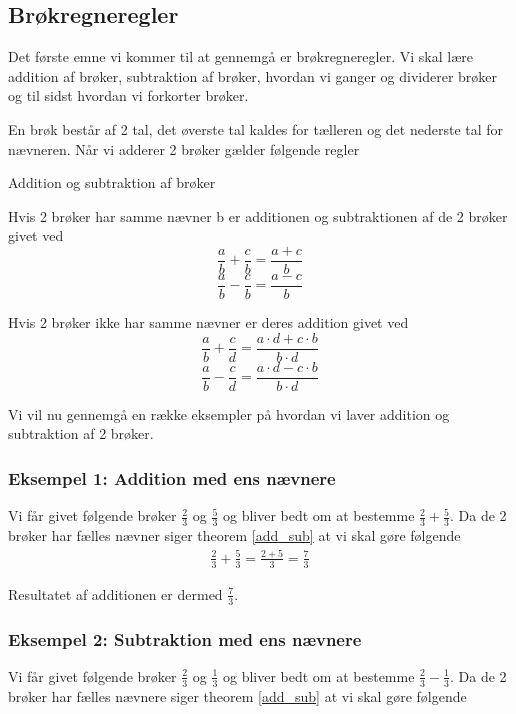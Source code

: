 \subsection{Brøkregneregler}

Det første emne vi kommer til at gennemgå er brøkregneregler. Vi skal lære addition af brøker, subtraktion af brøker, hvordan vi ganger og dividerer brøker og til sidst hvordan vi forkorter brøker. 

En brøk består af 2 tal, det øverste tal kaldes for tælleren og det nederste tal for nævneren. Når vi adderer 2 brøker gælder følgende regler

\begin{frm-thm}{Addition og subtraktion af brøker}


Hvis 2 brøker har samme nævner b er additionen og subtraktionen af de 2 brøker givet ved
\[ \frac{a}{b} + \frac{c}{b} = \frac{a + c}{b}   \]
\[\frac{a}{b} - \frac{c}{b} = \frac{a - c}{b}\]

Hvis 2 brøker ikke har samme nævner er deres addition givet ved
\[ \frac{a}{b} + \frac{c}{d} = \frac{a\cdot d + c \cdot b}{b \cdot d} \]
\[\frac{a}{b} - \frac{c}{d} = \frac{a\cdot d - c\cdot b}{b \cdot d} \]
\end{frm-thm}

Vi vil nu gennemgå en række eksempler på hvordan vi laver addition og subtraktion af 2 brøker.

\subsubsection*{Eksempel 1: Addition med ens nævnere}

Vi får givet følgende brøker $\frac{2}{3}$ og $\frac{5}{3}$ og bliver bedt om at bestemme $\frac{2}{3} + \frac{5}{3}$. Da de 2 brøker har fælles nævner siger theorem \ref{add_sub} at vi skal gøre følgende
\begin{align*}
\frac{2}{3} + \frac{5}{3} = \frac{2 + 5}{3} = \frac{7}{3}
\end{align*}

Resultatet af additionen er dermed $\frac{7}{3}$.

\subsubsection*{Eksempel 2: Subtraktion med ens nævnere}

Vi får givet følgende brøker $\frac{2}{3}$ og $\frac{1}{3}$ og bliver bedt om at bestemme $\frac{2}{3} - \frac{1}{3}$. Da de 2 brøker har fælles nævnere siger theorem \ref{add_sub} at vi skal gøre følgende

